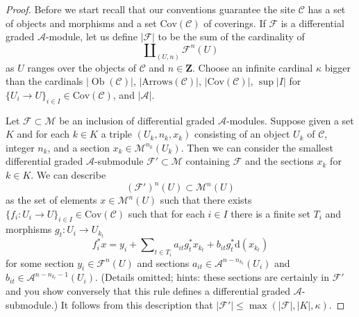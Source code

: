 \documentclass[10pt,a4paper]{amsart}
\theoremstyle{plain}
\theoremstyle{definition}
\theoremstyle{remark}
\numberwithin{equation}{subsection}
\def\Ob{\mathop{\mathrm{Ob}}\nolimits}
\begin{document}
\begin{proof}
Before we start recall that our conventions guarantee the site $\mathcal{C}$
has a set of objects and morphisms and a set $\text{Cov}(\mathcal{C})$
of coverings.
If $\mathcal{F}$
is a differential graded $\mathcal{A}$-module, let us define $|\mathcal{F}|$
to be the sum of the cardinality of
$$
\coprod\nolimits_{(U, n)} \mathcal{F}^n(U)
$$
as $U$ ranges over the objects of $\mathcal{C}$ and $n \in \mathbf{Z}$.
Choose an infinite cardinal $\kappa$ bigger than
the cardinals $|\Ob(\mathcal{C})|$, $|\text{Arrows}(\mathcal{C})|$,
$|\text{Cov}(\mathcal{C})|$, $\sup |I|$ for
$\{U_i \to U\}_{i \in I} \in \text{Cov}(\mathcal{C})$,
and $|\mathcal{A}|$.

\medskip\noindent
Let $\mathcal{F} \subset \mathcal{M}$ be an inclusion of
differential graded $\mathcal{A}$-modules.
Suppose given a set $K$ and for each $k \in K$ a triple
$(U_k, n_k, x_k)$ consisting of an object $U_k$ of $\mathcal{C}$,
integer $n_k$, and a section $x_k \in \mathcal{M}^{n_k}(U_k)$.
Then we can consider the smallest differential graded
$\mathcal{A}$-submodule $\mathcal{F}' \subset \mathcal{M}$
containing $\mathcal{F}$ and the sections $x_k$ for $k \in K$.
We can describe
$$
(\mathcal{F}')^n(U) \subset \mathcal{M}^n(U)
$$
as the set of elements $x \in \mathcal{M}^n(U)$ such that there
exists $\{f_i : U_i \to U\}_{i \in I} \in \text{Cov}(\mathcal{C})$ such that
for each $i \in I$ there is a finite set $T_i$ and morphisms
$g_t : U_i \to U_{k_t}$
$$
f_i^*x = y_i +
\sum\nolimits_{t \in T_i} a_{it}g_t^*x_{k_t} + b_{it}g_t^*\text{d}(x_{k_t})
$$
for some section $y_i \in \mathcal{F}^n(U)$ and
sections $a_{it} \in \mathcal{A}^{n - n_{k_t}}(U_i)$
and $b_{it} \in \mathcal{A}^{n - n_{k_t} - 1}(U_i)$.
(Details omitted; hints: these sections are certainly in $\mathcal{F}'$
and you show conversely that this rule defines a differential
graded $\mathcal{A}$-submodule.)
It follows from this description that
$|\mathcal{F}'| \leq \max(|\mathcal{F}|, |K|, \kappa)$.


\end{proof}
\end{document}
